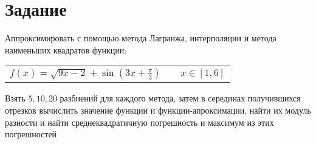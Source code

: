 \documentclass[a4paper,12pt]{extarticle}
\begin{document}
    \setcounter{page}{2}
    \tableofcontents
    \vspace{\baselineskip}

    \newpage
    \section{Задание}

    Аппроксимировать с помощью метода Лагранжа,
    интерполяции и метода наименьших квадратов функции:\\

    \begin{table}[ht]
        \centering
        \begin{tabular}{p{10cm}cp{3cm}}
            $f(x)=\sqrt{9x-2}+\sin(3x + \frac{\pi}{3})$& \hfill & $  x \in \left[1, 6\right] $\\
        \end{tabular}
    \end{table}


    Взять $5,10,20$ разбиений для каждого метода, затем в серединах получившихся отрезков вычислить значение функции и функции-апроксимации, найти их модуль разности и найти среднеквадратичную погрешность и максимум из этих погрешностей
\end{document}
